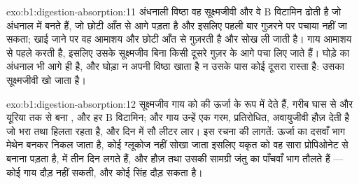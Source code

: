 \begin{solution}{exo:b1:digestion-absorption:11}
अंधनाली विष्ठा वह सूक्ष्मजीवी  और वे B विटामिन ढोती है जो
अंधनाल में बनते हैं, जो छोटी आँत से आगे पड़ता है और इसलिए पहली बार गुज़रने
पर पचाया नहीं जा सकता; खाई जाने पर वह आमाशय
और छोटी आँत से गुज़रती है और सोख ली जाती है। गाय आमाशय से पहले 
करती है, इसलिए उसके सूक्ष्मजीव बिना किसी दूसरे गुज़र के आगे पचा लिए जाते
हैं। घोड़े का अंधनाल भी आगे ही है, और घोड़ा न अपनी विष्ठा खाता है न उसके
पास कोई दूसरा रास्ता है: उसका सूक्ष्मजीवी  खो जाता है।
\end{solution}

\begin{solution}{exo:b1:digestion-absorption:12}
सूक्ष्मजीव गाय को  की ऊर्जा  के रूप में देते हैं, गरीब
घास से और यूरिया तक से बना , और हर B विटामिन;
और गाय उन्हें एक गरम, प्रतिरोधित, अवायुजीवी हौज़ देती है जो भरा तथा
हिलता रहता है, और दिन में सौ लीटर लार। इस रचना की लागतें: ऊर्जा का
दसवाँ भाग मेथेन बनकर निकल जाता है, कोई ग्लूकोज नहीं सोखा जाता इसलिए
यकृत को वह सारा प्रोपिओनेट से बनाना पड़ता है,  में तीन दिन लगते हैं,
और हौज़ तथा उसकी सामग्री जंतु का पाँचवाँ भाग तौलते हैं --- कोई गाय
दौड़ नहीं सकती, और कोई सिंह दौड़ सकता है।
\end{solution}

